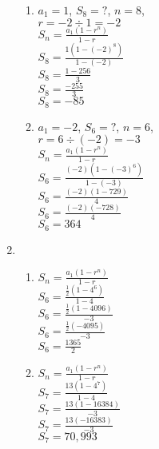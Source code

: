 \begin{enumerate}[label = \Alph*. ]
\begin{enumerate}[label = \arabic*. ]
	\item %
		$a_1=1$, $S_{8}=?$, $n=8$,\\
$r= -2\div 1= -2$\\
$\displaystyle S_{n} = \frac{a_1(1-r^n)}{1-r}$\\
$\displaystyle S_{8} = \frac{1(1-(-2)^8)}{1-(-2)}$\\
$\displaystyle S_{8} = \frac{1-256}{3}$\\
$\displaystyle S_{8} = \frac{-255}{3}$\\
$ S_{8} = -85$

	\item %
		$a_1=-2$, $S_{6}=?$, $n=6$,\\
$r= 6\div (-2)= -3$\\
$\displaystyle S_{n} = \frac{a_1(1-r^n)}{1-r}$\\
$\displaystyle S_{6} = \frac{(-2)(1-(-3)^6)}{1-(-3)}$\\
$\displaystyle S_{6} = \frac{(-2)(1-729)}{4}$\\
$\displaystyle S_{6} = \frac{(-2)(-728)}{4}$\\
$ S_{6} =364$\\


\end{enumerate}

\vspce

\item \phantom{b} %

\begin{enumerate}[label = \arabic*. ]


\item %
$ S_{n} = \displaystyle\frac{a_1(1-r^n)}{1-r}$\\
$ S_{6} = \displaystyle\frac{\frac{1}{2}(1-4^6)}{1-4}$\\
$ S_{6} = \displaystyle\frac{\frac{1}{2}(1-4096)}{-3}$\\
$ S_{6} = \displaystyle\frac{\frac{1}{2}(-4095)}{-3}$\\
$ S_{6} = \displaystyle\frac{1365}{2}$\\

\item%
$ S_{n} = \displaystyle\frac{a_1(1-r^n)}{1-r}$\\
$ S_{7} = \displaystyle\frac{13(1-4^7)}{1-4}$\\
$ S_{7} = \displaystyle\frac{13(1-16384)}{-3}$\\
$ S_{7} = \displaystyle\frac{13(-16383)}{-3}$\\
$ S_{7} = 70,993$


\end{enumerate}
\end{enumerate}
